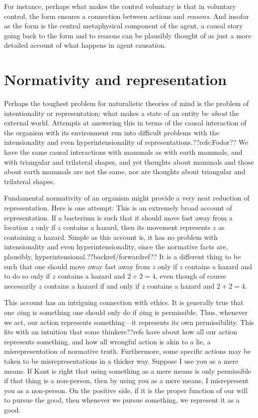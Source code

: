 For instance, perhaps what makes the control voluntary is that in voluntary control, the form ensures a connection between
actions and \textit{reasons}. And insofar as the form is the central metaphysical component of the agent, a causal story 
going back to the form and to reasons can be plausibly thought of as just a more detailed account of what happens in 
agent causation.

\section{Normativity and representation}
Perhaps the toughest problem for naturalistic theories of mind is the problem of intentionality or representation:
what makes a state of an entity be \textit{about} the external world. Attempts at answering this in terms of the 
causal interaction of the organism with its environment run into difficult problems with the intensionality and 
even hyperintensionality of representations.??refs:Fodor?? We have the same causal interactions with mammals as with earth mammals,
and with triangular and trilateral shapes, and yet thoughts about mammals and those about earth mammals are not the same,
nor are thoughts about triangular and trilateral shapes. 

Fundamental normativity of an organism might provide a very neat reduction of representation. Here is one attempt: 
 This is an extremely broad account of representation. If a bacterium is such that it 
should move fast away from a location $z$ only if $z$ contains a hazard, then its movement represents $z$ as containing 
a hazard. Simple as this account is, it has no problem with intensionality and even hyperintensionality, since the 
normative facts are, plausibly, hyperintensional.??backref/forwardref?? It is a different thing to be such that one should move 
away fast away from $z$ only if $z$ contains a hazard and to do so only if $z$ contains a hazard and $2+2=4$, even though
of course necessarily $z$ contains a hazard if and only if $z$ contains a hazard and $2+2=4$.

This account has an intriguing connection with ethics. It is generally true that one $\phi$ing is something one should only do 
if $\phi$ing is permissible. Thus, whenever we act, our action represents something---it represents its own permissibility. 
This fits with an intuition that some thinkers??refs have about how all our action represents something, and how all wrongful
action is akin to a lie, a misrepresentation of normative truth. Furthermore, some specific actions may be taken to be 
misrepresentations in a thicker way. Suppose I use you as a mere means. If Kant is right that using something as a mere means 
is only permissible if that thing is a non-person, then by using you as a mere means, I misrepresent you as a non-person.  
On the positive side, if it is the proper function of our will to pursue the good, then whenever we pursue something, we 
represent it as a good. 

